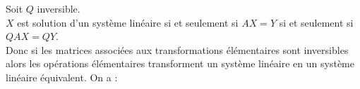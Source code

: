 \documentclass{book}
\begin{document}
\begin{Demonstration}
Soit $Q$ inversible.\\
$X$ est solution d'un système linéaire si et seulement si $AX=Y$ si et seulement si $QAX=QY$.\\
Donc si les matrices  associées aux transformations élémentaires sont inversibles alors  les opérations élémentaires transforment un système linéaire en un système linéaire équivalent. On a :
\end{Demonstration}
\end{document}
